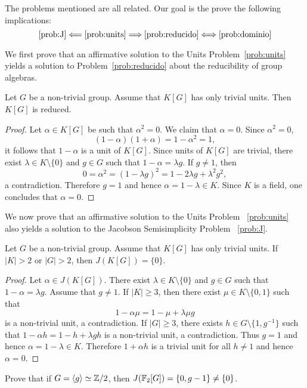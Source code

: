 The problems mentioned are all related. Our goal is the prove
the following implications:
\[
	\ref{prob:J}\Longleftarrow\ref{prob:units}\Longrightarrow\ref{prob:reducido}\Longleftrightarrow\ref{prob:dominio}
\]

We first prove that an affirmative solution to the Units
Problem~\ref{prob:units} yields a solution to Problem~\ref{prob:reducido}
about the reducibility of group algebras.

\begin{theorem}
	Let $G$ be a non-trivial group. Assume that $K[G]$ has only trivial units.
	Then $K[G]$ is reduced. 
\end{theorem}

\begin{proof}
	Let $\alpha\in K[G]$ be such that $\alpha^2=0$. We claim that 
	$\alpha=0$. Since $\alpha^2=0$, 
	\[
		(1-\alpha)(1+\alpha)=1-\alpha^2=1, 
	\]
	it follows that $1-\alpha$ is a unit of $K[G]$. Since units of $K[G]$ are 
	trivial, there exist $\lambda\in K\setminus\{0\}$ and $g\in G$ such that 
	$1-\alpha=\lambda g$. If $g\ne 1$, then 
	\[
		0=\alpha^2=(1-\lambda g)^2=1-2\lambda g+\lambda^2g^2,
	\]
	a contradiction. Therefore $g=1$ and hence $\alpha=1-\lambda\in K$. Since
	$K$ is a field, one concludes that $\alpha=0$.
\end{proof}

We now prove that an affirmative solution to the Units Problem
~\ref{prob:units} also yields a solution to the Jacobson Semisimplicity Problem
~\ref{prob:J}. 

\begin{theorem}
	Let $G$ be a non-trivial group. Assume that $K[G]$ has only trivial units. 
	If $|K|>2$ or $|G|>2$, then $J(K[G])=\{0\}$.
\end{theorem}

\begin{proof}
	Let $\alpha\in J(K[G])$. There exist $\lambda\in K\setminus\{0\}$ and $g\in
	G$ such that $1-\alpha=\lambda g$. Assume that $g\ne 1$.  If $|K|\geq3$,
	then there exist $\mu\in K\setminus\{0,1\}$ such that
	\[
		1-\alpha\mu=1-\mu+\lambda\mu g 
	\]
	is a non-trivial unit, a contradiction.
	If $|G|\geq3$, there exists $h\in G\setminus\{1,g^{-1}\}$ such that
	$1-\alpha h=1-h+\lambda gh$ is a non-trivial unit, a contradiction.  Thus
	$g=1$ and hence $\alpha=1-\lambda\in K$. Therefore $1+\alpha h$ is a
	trivial unit for all $h\ne 1$ and hence 	$\alpha=0$.
\end{proof}

\begin{exercise}
	Prove that if $G=\langle g\rangle\simeq\mathbb{Z}/2$, then 
	$J(\mathbb{F}_2[G])=\{0,g-1\}\ne\{0\}$. 
\end{exercise}

